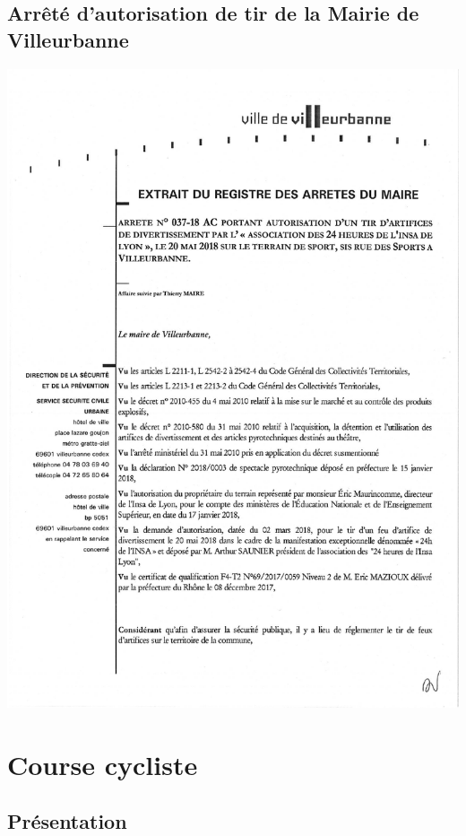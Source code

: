 \documentclass[hidelinks, paper=a4, fontsize=13pt]{report}
\begin{document}
\subsection{Arrêté d’autorisation de tir de la Mairie de Villeurbanne}
\begin{center}
\includegraphics[scale=0.7]{Annexes/Documents/Villeurbannefeud'artifice}
\end{center}


\newpage
\section{Course cycliste}

\subsection{Présentation}
\end{document}
